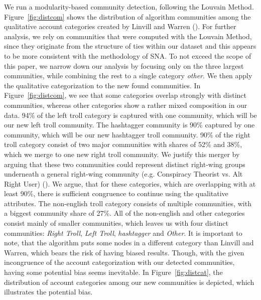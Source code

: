 \documentclass[12pt, titlepage=true, toc=bib]{scrartcl}
\begin{document}
We run a modularity-based community detection, following the Louvain Method. Figure~\ref{fig:distcom} shows the distribution of algorithm communities among the qualitative account categories created by Linvill and Warren (\cite*{linvill_troll_2018}). For further analysis, we rely on communities that were computed with the Louvain Method, since they originate from the structure of ties within our dataset and this appears to be more consistent with the methodology of SNA. To not exceed the scope of this paper, we narrow down our analysis by focusing only on the three largest communities, while combining the rest to a single category \textit{other}. We then apply the qualitative categorization to the new found communities. In Figure~\ref{fig:distcom}, we see that some categories overlap strongly with distinct communities, whereas other categories show a rather mixed composition in our data. 94\% of the left troll category is captured with one community, which will be our new left troll community. The hashtagger community is 90\% captured by one community, which will be our new hashtagger troll community. 90\% of the right troll category consist of two major communities with shares of 52\% and 38\%, which we merge to one new right troll community. We justify this merger by arguing that these two communities could represent distinct right-wing groups underneath a general right-wing community (e.g. Conspiracy Theorist vs. Alt Right User) (\cite[cf.]{kaiser_unite_2018}). We argue, that for these categories, which are overlapping with at least 90\%, there is sufficient congruence to continue using the qualitative attributes. The non-english troll category consists of multiple communities, with a biggest community share of 27\%. All of the non-english and other categories consist mainly of smaller communities, which leaves us with four distinct communities: \textit{Right Troll}, \textit{Left Troll}, \textit{hashtagger} and \textit{Other}. It is important to note, that the algorithm puts some nodes in a different category than Linvill and Warren, which bears the risk of having biased results. Though, with the given incongruence of the account categorization with our detected communities, having some potential bias seems inevitable. In Figure~\ref{fig:distcat}, the distribution of account categories among our new communities is depicted, which illustrates the potential bias.
\end{document}
